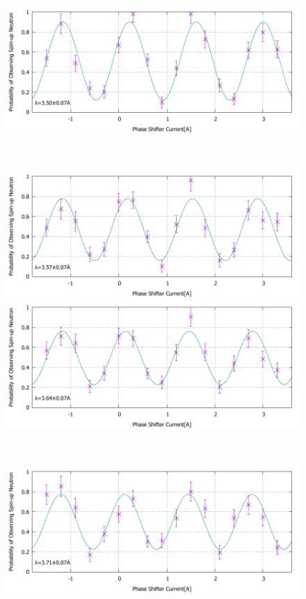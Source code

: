 \begin{figure}[h]
\begin{minipage}{0.5\hsize}
\end{minipage}
\begin{minipage}{0.5\hsize}
\includegraphics[width=\hsize]{discussion/IF_rb/Interference_rb_fit490.pdf}
\end{minipage}\\
\begin{minipage}{0.5\hsize}
\includegraphics[width=\hsize]{discussion/IF_rb/Interference_rb_fit500.pdf}
\end{minipage}
\begin{minipage}{0.5\hsize}
\includegraphics[width=\hsize]{discussion/IF_rb/Interference_rb_fit510.pdf}
\end{minipage}\\
\begin{minipage}{0.5\hsize}
\includegraphics[width=\hsize]{discussion/IF_rb/Interference_rb_fit520.pdf}

\end{minipage}
\end{figure}

